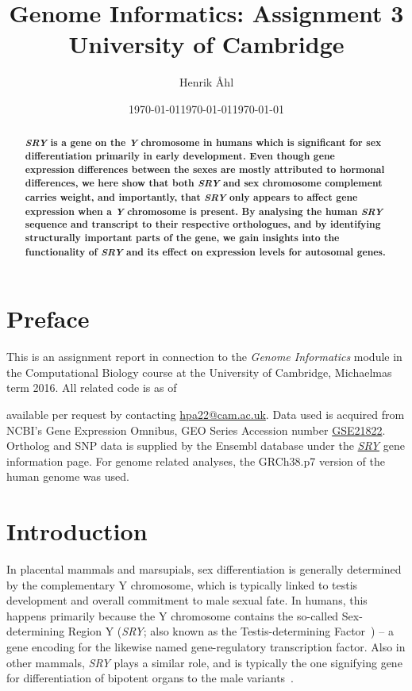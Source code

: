 \documentclass[10pt, twocolumn]{article}\usepackage[]{graphicx}\usepackage[]{color}
\title
{
\textbf
{
Genome Informatics: Assignment 3}\\[1em]
\small{University of Cambridge}
}
\author{Henrik Åhl}
\date{\today}
\theoremstyle{plain}
\newcommand{\SRY}{\textit{SRY}\xspace}
\newcommand{\Y}{\textit{Y}\xspace}
\begin{document}
\date{\today}
\maketitle
\setcounter{page}{1}
\begin{abstract}
{\bf \SRY is a gene on the \Y chromosome in humans which is significant for sex differentiation primarily in early development. Even though gene expression differences between the sexes are mostly attributed to hormonal differences, we here show that both \SRY and sex chromosome complement carries weight, and importantly, that \SRY only appears to affect gene expression when a \Y chromosome is present. By analysing the human \SRY sequence and transcript to their respective orthologues, and by identifying structurally important parts of the gene, we gain insights into the functionality of \SRY and its effect on expression levels for autosomal genes.  
}
\end{abstract}
\section*{Preface}
This is an assignment report in connection to the \textit{Genome Informatics} module in the Computational Biology course at the University of Cambridge, Michaelmas term 2016. All related code is as of \date{\today} available per request by contacting \href{mailto:hpa22@cam.ac.uk}{hpa22@cam.ac.uk}. Data used is acquired from NCBI's Gene Expression Omnibus, GEO Series Accession number \href{https://www.ncbi.nlm.nih.gov/geo/query/acc.cgi?acc=GSE21822}{GSE21822}. Ortholog and SNP data is supplied by the Ensembl database under the \href{http://www.ensembl.org/Homo_sapiens/Gene/Summary?db=core;g=ENSG00000184895;r=Y:2786855-2787699;t=ENST00000383070}{\SRY} gene information page. For genome related analyses, the GRCh38.p7 version of the human genome was used. 

\section*{Introduction}
In placental mammals and marsupials, sex differentiation is generally determined by the complementary Y chromosome, which is typically linked to testis development and overall commitment to male sexual fate. In humans, this happens primarily because the Y chromosome contains the so-called Sex-determining Region Y (\SRY; also known as the Testis-determining Factor~\cite{tdf}) -- a gene encoding for the likewise named gene-regulatory transcription factor. Also in other mammals, \SRY plays a similar role, and is typically the one signifying gene for differentiation of bipotent organs to the male variants~\cite{riseandfall,bipotent}. 
\end{document}
